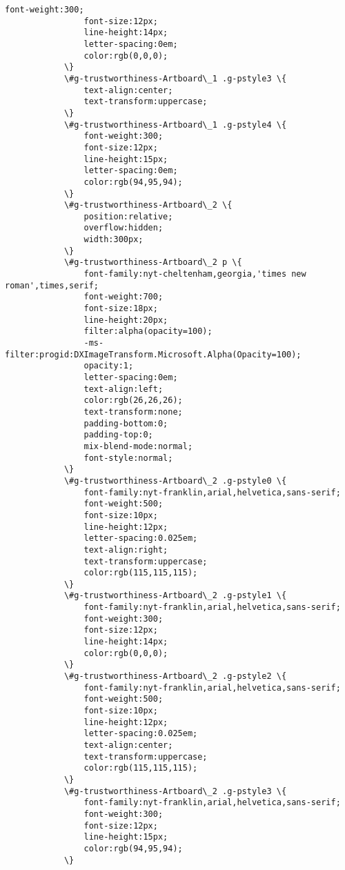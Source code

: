 \documentclass[11pt]{article}
\begin{document}
\begin{Verbatim}[commandchars=\\\{\}]
         		font-weight:300;
         		font-size:12px;
         		line-height:14px;
         		letter-spacing:0em;
         		color:rgb(0,0,0);
         	\}
         	\#g-trustworthiness-Artboard\_1 .g-pstyle3 \{
         		text-align:center;
         		text-transform:uppercase;
         	\}
         	\#g-trustworthiness-Artboard\_1 .g-pstyle4 \{
         		font-weight:300;
         		font-size:12px;
         		line-height:15px;
         		letter-spacing:0em;
         		color:rgb(94,95,94);
         	\}
         	\#g-trustworthiness-Artboard\_2 \{
         		position:relative;
         		overflow:hidden;
         		width:300px;
         	\}
         	\#g-trustworthiness-Artboard\_2 p \{
         		font-family:nyt-cheltenham,georgia,'times new roman',times,serif;
         		font-weight:700;
         		font-size:18px;
         		line-height:20px;
         		filter:alpha(opacity=100);
         		-ms-filter:progid:DXImageTransform.Microsoft.Alpha(Opacity=100);
         		opacity:1;
         		letter-spacing:0em;
         		text-align:left;
         		color:rgb(26,26,26);
         		text-transform:none;
         		padding-bottom:0;
         		padding-top:0;
         		mix-blend-mode:normal;
         		font-style:normal;
         	\}
         	\#g-trustworthiness-Artboard\_2 .g-pstyle0 \{
         		font-family:nyt-franklin,arial,helvetica,sans-serif;
         		font-weight:500;
         		font-size:10px;
         		line-height:12px;
         		letter-spacing:0.025em;
         		text-align:right;
         		text-transform:uppercase;
         		color:rgb(115,115,115);
         	\}
         	\#g-trustworthiness-Artboard\_2 .g-pstyle1 \{
         		font-family:nyt-franklin,arial,helvetica,sans-serif;
         		font-weight:300;
         		font-size:12px;
         		line-height:14px;
         		color:rgb(0,0,0);
         	\}
         	\#g-trustworthiness-Artboard\_2 .g-pstyle2 \{
         		font-family:nyt-franklin,arial,helvetica,sans-serif;
         		font-weight:500;
         		font-size:10px;
         		line-height:12px;
         		letter-spacing:0.025em;
         		text-align:center;
         		text-transform:uppercase;
         		color:rgb(115,115,115);
         	\}
         	\#g-trustworthiness-Artboard\_2 .g-pstyle3 \{
         		font-family:nyt-franklin,arial,helvetica,sans-serif;
         		font-weight:300;
         		font-size:12px;
         		line-height:15px;
         		color:rgb(94,95,94);
         	\}
         

\end{Verbatim}
\end{document}
